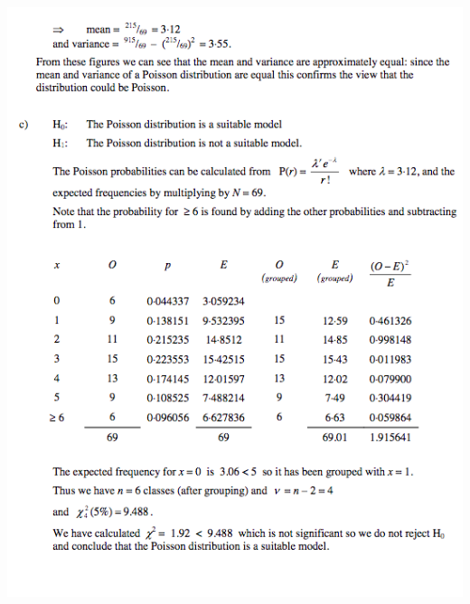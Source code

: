 \documentclass[a4paper]{article}
\begin{document}
\begin{center}
	\includegraphics[scale=0.5]{img_S/19_eg3}
\end{center}
\end{document}
